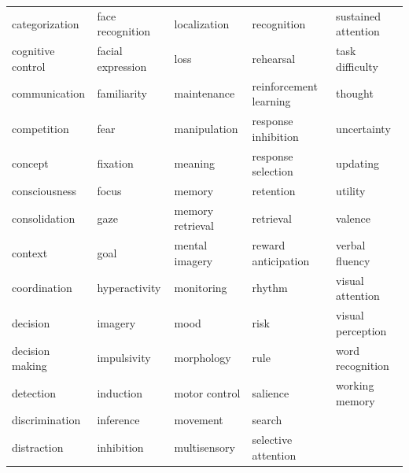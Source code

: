 \documentclass[12pt,aps,pra,reprint,showkeys]{revtex4-1}
\begin{document}
\begin{table}[htp]
\begin{minipage}[c][\textheight][c]{\textwidth}
\begin{center}
\begin{tabular}{l l l l l}
        categorization          & face recognition   & localization           & recognition            & sustained attention    \\
        cognitive control       & facial expression  & loss                   & rehearsal              & task difficulty        \\
        communication           & familiarity        & maintenance            & reinforcement learning & thought                \\
        competition             & fear               & manipulation           & response inhibition    & uncertainty            \\
        concept                 & fixation           & meaning                & response selection     & updating               \\
        consciousness           & focus              & memory                 & retention              & utility                \\
        consolidation           & gaze               & memory retrieval       & retrieval              & valence                \\
        context                 & goal               & mental imagery         & reward anticipation    & verbal fluency         \\
        coordination            & hyperactivity      & monitoring             & rhythm                 & visual attention       \\
        decision                & imagery            & mood                   & risk                   & visual perception      \\
        decision making         & impulsivity        & morphology             & rule                   & word recognition       \\
        detection               & induction          & motor control          & salience               & working memory         \\
        discrimination          & inference          & movement               & search                 &                        \\
        distraction             & inhibition         & multisensory           & selective attention    &                        \\
      \end{tabular}
    \end{center}
  \end{minipage}
\end{table}
\end{document}
